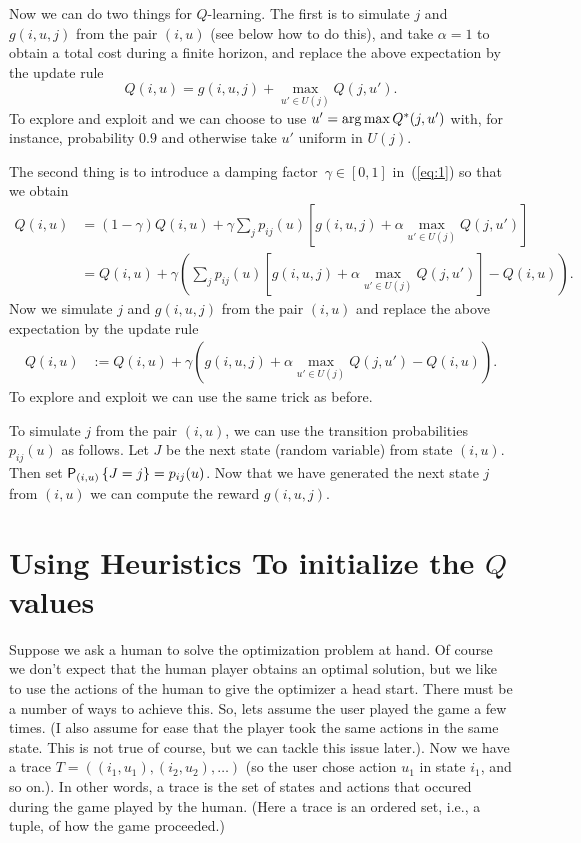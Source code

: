\documentclass{article}
\begin{document}
Now we can do two things for $Q$-learning.  The first is to  simulate $j$  and $g(i,u,j)$ from the
pair $(i,u)$ (see below how to do this), and take $\alpha=1$ to obtain a total cost during a finite horizon, and replace the above expectation by the update rule
\begin{equation*}
  Q(i,u)  = g(i,u,j) + \max_{u'\in U(j)} Q(j,u').
\end{equation*}
To explore and exploit and we can choose to use
$u' = \argmax Q^*(j,u')$ with, for instance, probability $0.9$ and
otherwise take $u'$ uniform in $U(j)$.

The second thing is to introduce a damping factor~$\gamma\in[0,1]$ in~(\ref{eq:1}) so that we obtain 
\begin{equation*}
  \begin{split}
  Q(i,u) 
&=  (1-\gamma)Q(i,u) + \gamma \sum_{j} p_{ij}(u) \left[g(i,u,j) + \alpha \max_{u'\in U(j)} Q(j,u')\right] \\
&=  Q(i,u) + \gamma \left(\sum_{j} p_{ij}(u) \left[g(i,u,j) + \alpha \max_{u'\in U(j)} Q(j,u')\right] - Q(i,u)\right).
  \end{split}
\end{equation*}
Now we simulate $j$ and $g(i,u,j)$ from the
pair $(i,u)$ and replace the above expectation by the update rule
\begin{equation}\label{eq:3}
  \begin{split}
  Q(i,u) 
&:=  Q(i,u) + \gamma \left(g(i,u,j) + \alpha \max_{u'\in U(j)} Q(j,u')- Q(i,u)\right).
  \end{split}
\end{equation}
To explore and exploit  we can use the same trick as before.

\begin{remark}
  To simulate $j$ from the pair $(i,u)$,  we can use the transition probabilities $p_{ij}(u)$ as follows. Let $J$ be the next state (random variable) from state $(i,u)$. Then set $\P{J=j}_{(i,u)} = p_{ij}(u)$.  Now that we have generated the next state $j$ from $(i,u)$ we can compute the reward $g(i,u,j)$. 
\end{remark}


\section{Using Heuristics To initialize the $Q$ values}
\label{sec:using-heuristics-as}

Suppose we ask a human to solve the optimization problem at hand. Of course we don't expect that the human player obtains an optimal solution, but we like to use the actions of the human to give the optimizer a head start. There must  be a number of ways to achieve this. So, lets assume the user played the game a few times. (I also assume for ease that the player took the same actions in the same state. This is not true of course, but we can tackle this issue later.). Now we have a trace $T = ((i_1,u_1), (i_2,u_2),\ldots)$ (so the user chose action $u_1$ in state $i_1$, and so on.). In other words, a trace is the set of states and actions that occured during the game played by the human.  (Here a trace is an ordered set, i.e., a tuple, of how the game proceeded.)
\end{document}
